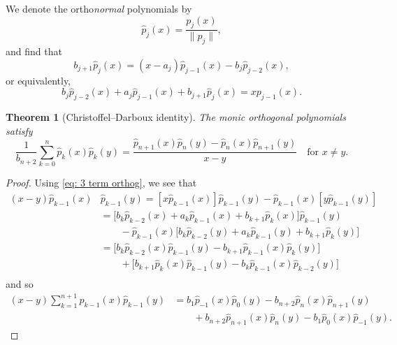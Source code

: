 \documentclass[12pt,a4paper]{article}
\newtheorem{theorem}{Theorem}
\begin{document}
We denote the ortho\emph{normal} polynomials by
\[
\hat p_j(x)=\frac{p_j(x)}{\|p_j\|},
\]
and find that
\[
b_{j+1}\hat p_j(x)=(x-a_j)\hat p_{j-1}(x)-b_j\hat p_{j-2}(x),
\]
or equivalently,
\begin{equation}\label{eq: 3 term orthog}
b_j\hat p_{j-2}(x)+a_j\hat p_{j-1}(x)+b_{j+1}\hat p_j(x)=xp_{j-1}(x).
\end{equation}

\begin{theorem}[Christoffel--Darboux identity]
\label{thm: Christoffel-Darboux}
The monic orthogonal polynomials satisfy
\[
\frac{1}{b_{n+2}}\sum_{k=0}^n\hat p_k(x)\hat p_k(y)
	=\frac{\hat p_{n+1}(x)\hat p_n(y)-\hat p_n(x)\hat p_{n+1}(y)}{x-y}
	\quad\text{for $x\ne y$.}
\]
\end{theorem}
\begin{proof}
Using \eqref{eq: 3 term orthog}, we see that
\begin{align*}
(x-y)\hat p_{k-1}(x)&\hat p_{k-1}(y)
	=[x\hat p_{k-1}(x)]\hat p_{k-1}(y)
		-\hat p_{k-1}(x)[y\hat p_{k-1}(y)]\\
	&=\bigl[
	b_k\hat p_{k-2}(x)+a_k\hat p_{k-1}(x)+b_{k+1}\hat p_k(x)
	\bigr]\hat p_{k-1}(y)\\
	&\qquad{}-\hat p_{k-1}(x)\bigl[
	b_k\hat p_{k-2}(y)+a_k\hat p_{k-1}(y)+b_{k+1}\hat p_k(y)\bigr]\\
	&=\bigl[b_k\hat p_{k-2}(x)\hat p_{k-1}(y)
		-b_{k+1}\hat p_{k-1}(x)\hat p_k(y)\bigr]\\
	&\qquad{}+\bigl[b_{k+1}\hat p_k(x)\hat p_{k-1}(y)
		-b_k\hat p_{k-1}(x)\hat p_{k-2}(y)\bigr]\\
\end{align*}
and so
\begin{align*}
(x-y)\sum_{k=1}^{n+1}\hat p_{k-1}(x)\hat p_{k-1}(y)
	&=b_1\hat p_{-1}(x)\hat p_0(y)-b_{n+2}\hat p_n(x)\hat p_{n+1}(y)\\
	&\qquad{}+b_{n+2}\hat p_{n+1}(x)\hat p_n(y)
		-b_1\hat p_0(x)\hat p_{-1}(y).
\end{align*}
\end{proof}
\end{document}
